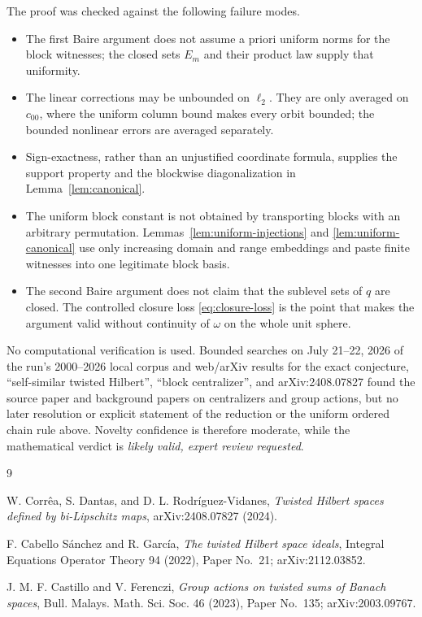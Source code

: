 \documentclass[11pt]{article}
\newcommand{\czz}{c_{00}}
\begin{document}
The proof was checked against the following failure modes.
\begin{itemize}
\item The first Baire argument does not assume a priori uniform norms for
the block witnesses; the closed sets $E_m$ and their product law supply
that uniformity.
\item The linear corrections may be unbounded on $\ell_2$.  They are only
averaged on $\czz$, where the uniform column bound makes every orbit
bounded; the bounded nonlinear errors are averaged separately.
\item Sign-exactness, rather than an unjustified coordinate formula, supplies
the support property and the blockwise diagonalization in
Lemma~\ref{lem:canonical}.
\item The uniform block constant is not obtained by transporting blocks with
an arbitrary permutation.  Lemmas~\ref{lem:uniform-injections} and
\ref{lem:uniform-canonical} use only increasing domain and range embeddings
and paste finite witnesses into one legitimate block basis.
\item The second Baire argument does not claim that the sublevel sets of
$q$ are closed.  The controlled closure loss \eqref{eq:closure-loss} is
the point that makes the argument valid without continuity of $\omega$ on
the whole unit sphere.
\end{itemize}

No computational verification is used.  Bounded searches on July 21--22, 2026
of the run's 2000--2026 local corpus and web/arXiv results for the exact
conjecture, ``self-similar twisted Hilbert'', ``block centralizer'', and
arXiv:2408.07827 found the source paper and background papers on centralizers
and group actions, but no later resolution or explicit statement of the
reduction or the uniform ordered chain rule above.  Novelty confidence is
therefore moderate, while the
mathematical verdict is \emph{likely valid, expert review requested}.

\begin{thebibliography}{9}

W. Corr\^ea, S. Dantas, and D. L. Rodr\'iguez-Vidanes,
\emph{Twisted Hilbert spaces defined by bi-Lipschitz maps},
arXiv:2408.07827 (2024).

F. Cabello S\'anchez and R. Garc\'ia,
\emph{The twisted Hilbert space ideals},
Integral Equations Operator Theory 94 (2022), Paper No.~21;
arXiv:2112.03852.

J. M. F. Castillo and V. Ferenczi,
\emph{Group actions on twisted sums of Banach spaces},
Bull. Malays. Math. Sci. Soc. 46 (2023), Paper No.~135;
arXiv:2003.09767.

\end{thebibliography}
\end{document}
